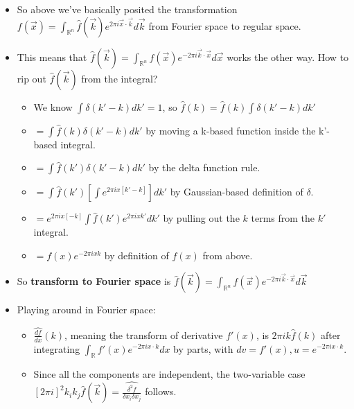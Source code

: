 \documentclass[11pt, oneside]{article}   	%
\begin{document}
\begin{itemize}
\item So above we've basically posited the transformation $f(\vec{x}) = \int_{\mathbb{R}^n}\hat{f}(\vec{k})e^{2 \pi i \vec{x} \cdot \vec{k}} d\vec{k}$ from Fourier space to regular space.
\item This means that $\hat{f}(\vec{k}) = \int_{\mathbb{R}^n}f(\vec{x})e^{-2 \pi i \vec{k} \cdot \vec{x}} d\vec{x}$ works the other way.  How to rip out $\hat{f}(\vec{k})$ from the integral?

\begin{itemize}
\item We know $\int \delta(k' - k) dk' = 1$, so $\hat{f}(k) = \hat{f}(k) \int \delta(k' - k) dk'$
\item $=  \int \hat{f}(k) \delta(k' - k) dk'$ by moving a k-based function inside the k'-based integral.
\item $ =  \int \hat{f}(k') \delta(k' - k) dk'$ by the delta function rule.
\item $= \int \hat{f}(k') [\int e^{2\pi i x [k'-k]} ]dk'$ by Gaussian-based definition of $\delta$.
\item $= e^{2\pi i x [-k]} \int \hat{f}(k') e^{2\pi i x k'}  dk'$ by pulling out the $k$ terms from the $k'$ integral.
\item $= f(x) e^{-2\pi i x k}$ by definition of $f(x)$ from above.
\end{itemize}

\item So \textbf{transform to Fourier space} is $\hat{f}(\vec{k}) = \int_{\mathbb{R}^n}f(\vec{x})e^{-2\pi i \vec{k}\cdot \vec{x}} d\vec{k}$
\item Playing around in Fourier space:
\begin{itemize}
\item $\hat{\frac{df}{dx}}(k)$, meaning the transform of derivative $f'(x)$, is $2\pi i k \hat{f}(k)$ after integrating $\int_{\mathbb{R}} f'(x)e^{-2\pi i x \cdot k}dx$ by parts, with $dv = f'(x), u = e^{-2\pi i x \cdot k}$. 
\item Since all the components are independent, the two-variable case $[2\pi i]^2 k_ik_j \hat{f}(\vec{k}) = \hat{\frac{\delta^2 f}{\delta x_i \delta x_j}}$ follows.
\end{itemize}
\end{itemize}
\end{document}
